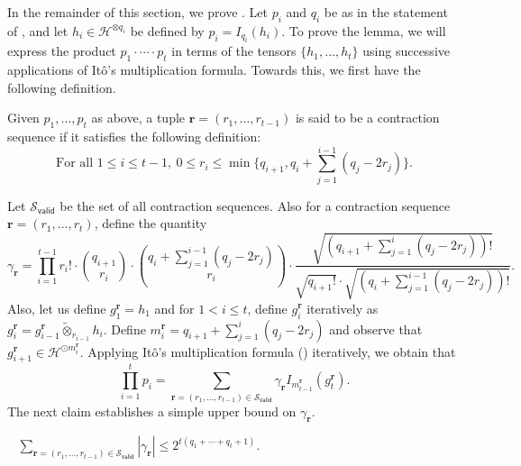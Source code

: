 \documentclass{toc}
\begin{document}
In the remainder of this section, we prove . Let $p_i$ and $q_i$
be as in the statement of , and let $h_i \in \mathcal{H}^{\otimes q_i}$
be defined by $p_i = I_{q_i}(h_i)$.
To prove the lemma, we will express the product $p_1 \cdot \cdots \cdot p_t$ in terms of the tensors $\{h_1, \ldots, h_t\}$ using successive applications of It\^{o}'s multiplication formula.  Towards this, we first have the following definition. 
\begin{definition} 
Given $p_1, \ldots, p_t$ as above, a tuple $\mathbf{r} = (r_1, \ldots, r_{t-1})$ is said to be a contraction sequence if it satisfies the following definition: 
\begin{equation}\label{eq:sequence}
\textrm{For all } 1\le i \le t-1, \  0 \le r_i \le \min \bigg\{ q_{i+1}, q_i+ \sum_{j=1}^{i-1} (q_j - 2 r_j) \bigg\}.
\end{equation}
\end{definition}
Let $\mathcal{S}_{\mathsf{valid}}$ be the set of all contraction sequences. 
Also for a contraction sequence $\mathbf{r}=(r_1, \ldots, r_t)$,
define the quantity 
\[
\gamma_{\mathbf{r}} = \prod_{i=1}^{t-1} r_i! \cdot \binom{q_{i+1}}{r_i} \cdot \binom{q_i+ \sum_{j=1}^{i-1} (q_j - 2 r_j) }{r_i} \cdot \frac{\sqrt{(q_{i+1}+ \sum_{j=1}^{i} (q_j - 2 r_j) )!}}{\sqrt{q_{i+1}!} \cdot \sqrt{(q_i+ \sum_{j=1}^{i-1} (q_j - 2 r_j))!}}. 
\]
Also, let us define $g^{\mathbf{r}}_1 = h_1$ and for $1 < i  \le t$, define $g^{\mathbf{r}}_i $ iteratively as $g^{\mathbf{r}}_i  = g^{\mathbf{r}}_{i-1} \widetilde{\otimes}_{r_{i-1}} h_i$. Define  $m^{\mathbf{r}}_i = q_{i+1} + \sum_{j=1}^{i} (q_j - 2 r_j)$ and  observe that $g^{\mathbf{r}}_{i+1}  \in \mathcal{H}^{\odot m^{\mathbf{r}}_i}$. 
Applying It\^{o}'s multiplication formula () iteratively, we obtain that
\begin{equation}\label{eq:Ito1}
\prod_{i=1}^t p_i = \sum_{\mathbf{r} =(r_1, \ldots, r_{t-1}) \in \mathcal{S}_{\mathsf{valid}}} \gamma_{\mathbf{r}} I_{m^{\mathbf{r}}_{t-1}}(g^{\mathbf{r}}_{t}).
\end{equation}
The next claim establishes a simple upper bound on $\gamma_{\mathbf{r}}$. 
\begin{claim}~\label{clm:bound-easy1}
$\sum_{\mathbf{r} =(r_1, \ldots, r_{t-1}) \in \mathcal{S}_{\mathsf{valid}}} |\gamma_{\mathbf{r}}| \le 2^{t (q_1 + \cdots + q_t +1 )}. $
\end{claim}
\end{document}
